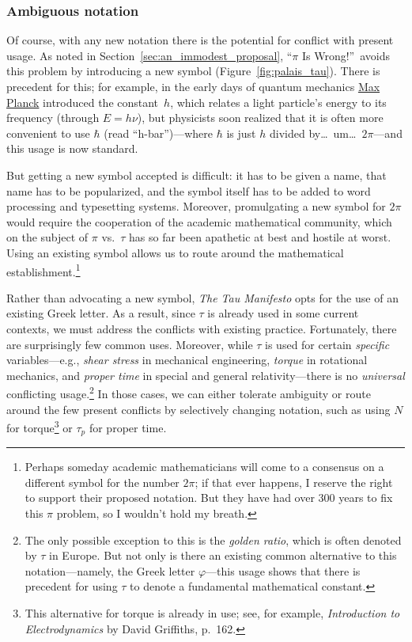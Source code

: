     \subsubsection{Ambiguous notation} %
    \label{sec:ambiguous_notation}


Of course, with any new notation there is the potential for conflict with present usage. As noted in Section~\ref{sec:an_immodest_proposal}, ``$\pi$ Is Wrong!''\ avoids this problem by introducing a new symbol (Figure~\ref{fig:palais_tau}). There is precedent for this; for example, in the early days of quantum mechanics \href{https://en.wikipedia.org/wiki/Max_Planck}{Max Planck} introduced the constant~$h$, which relates a light particle's energy to its frequency (through $E = h\nu$), but physicists soon realized that it is often more convenient to use $\hbar$ (read ``h-bar'')---where $\hbar$ is just $h$ divided by\ldots\ um\ldots\ $2\pi$---and this usage is now standard.

But getting a new symbol accepted is difficult: it has to be given a name, that name has to be popularized, and the symbol itself has to be added to word processing and typesetting systems. Moreover, promulgating a new symbol for $2\pi$ would require the cooperation of the academic mathematical community, which on the subject of $\pi$ vs.\ $\tau$ has so far been apathetic at best and hostile at worst. Using an existing symbol allows us to route around the mathematical establishment.\footnote{Perhaps someday academic mathematicians will come to a consensus on a different symbol for the number $2\pi$; if that ever happens, I reserve the right to support their proposed notation. But they have had over 300 years to fix this $\pi$ problem, so I wouldn't hold my breath.}

Rather than advocating a new symbol, \emph{The Tau Manifesto} opts for the use of an existing Greek letter. As a result, since $\tau$ is already used in some current contexts, we must address the conflicts with existing practice. Fortunately, there are surprisingly few common uses. Moreover, while $\tau$ is used for certain \emph{specific} variables---e.g., \emph{shear stress} in mechanical engineering, \emph{torque} in rotational mechanics, and \emph{proper time} in special and general relativity---there is no \emph{universal} conflicting usage.\footnote{The only possible exception to this is the \emph{golden ratio}, which is often denoted by $\tau$ in Europe. But not only is there an existing common alternative to this notation---namely, the Greek letter $\varphi$---this usage shows that there is precedent for using $\tau$ to denote a fundamental mathematical constant.} In those cases, we can either tolerate ambiguity or route around the few present conflicts by selectively changing notation, such as using $N$ for torque\footnote{This alternative for torque is already in use; see, for example, \emph{Introduction to Electrodynamics} by David Griffiths, p.~162.} or $\tau_p$ for proper time.

